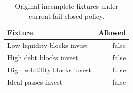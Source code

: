 \begin{table}[t]\centering
\caption{Fresh live LLM measurements.}
\end{table}
\begin{table}[t]\centering
\caption{Original incomplete fixtures under current fail-closed policy.}
\begin{tabular}{lr}\toprule
Fixture & Allowed \\\midrule
Low liquidity blocks invest & false \\
High debt blocks invest & false \\
High volatility blocks invest & false \\
Ideal passes invest & false \\
\bottomrule\end{tabular}\end{table}
